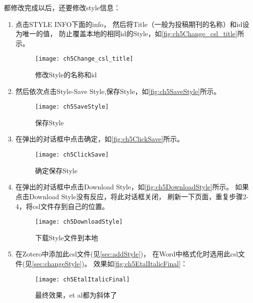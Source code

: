 \documentclass[cn,11pt,chinese]{elegantbook}
\begin{document}
				都修改完成以后，还要修改style信息：
				\begin{enumerate} \label{it:StyleInfo}
				\item 点击STYLE INFO下面的info，
				然后将Title（一般为投稿期刊的名称）和id设为唯一的值，
				防止覆盖本地的相同id的Style，如\autoref{fig:ch5Change_csl_title}所示。
				\begin{figure}[htbp]
					\centering
					\texttt{[image: ch5Change\_csl\_title]}
					\caption{修改Style的名称和id}
					\label{fig:ch5Change_csl_title}
				\end{figure}
			\item 然后依次点击Style-Save Style,保存Style，如\autoref{fig:ch5SaveStyle}所示。
				\begin{figure}[htbp]
					\centering
					\texttt{[image: ch5SaveStyle]}
					\caption{保存Style}
					\label{fig:ch5SaveStyle}
				\end{figure}
			\item 在弹出的对话框中点击确定，如\autoref{fig:ch5ClickSave}所示。
				\begin{figure}[htbp]
					\centering
					\texttt{[image: ch5ClickSave]}
					\caption{确定保存Style}
					\label{fig:ch5ClickSave}
				\end{figure}
			\item 在弹出的对话框中点击Download Style，如\autoref{fig:ch5DownloadStyle}所示。
			如果点击Download Style没有反应，将此对话框关闭，
			刷新一下页面，重复步骤2-4，将csl文件存到自己的位置。
				\begin{figure}[htbp]
					\centering
					\texttt{[image: ch5DownloadStyle]}
					\caption{下载Style文件到本地}
					\label{fig:ch5DownloadStyle}
				\end{figure}
			\item 在Zotero中添加此csl文件(见\cref{sec:addStyle})，
			在Word中格式化时选用此csl文件(见\cref{sec:changeStyle})。
			效果如\autoref{fig:ch5EtalItalicFinal}：
				\begin{figure}[htbp]
					\centering
					\texttt{[image: ch5EtalItalicFinal]}
					\caption{最终效果，et al都为斜体了}
					\label{fig:ch5EtalItalicFinal}
				\end{figure}
			\end{enumerate}	
	
\end{document}
